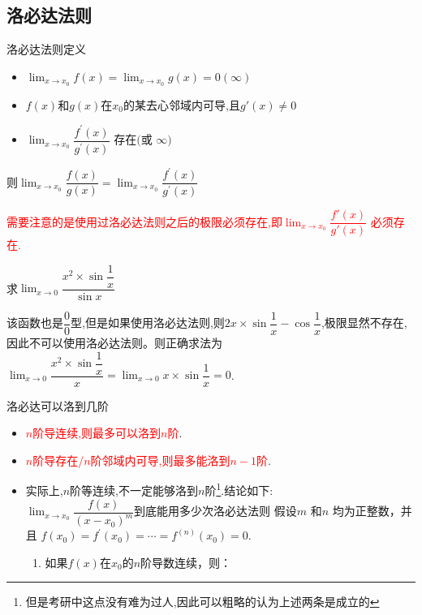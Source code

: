 \documentclass[9pt a4paper, oneside, UTF8]{ctexbook}
\begin{document}
\begin{sloppypar}
    \subsection{洛必达法则}
    \begin{defn}{洛必达法则定义}{}
        \begin{itemize}
            \item $\lim_{x\to x_0}f(x)=\lim_{x\to x_0}g(x)=0(\infty)$
            \item $f(x)$和$g(x)$在$x_0$的某去心邻域内可导,且$g'(x) \neq 0$
            \item $\lim_{x\to x_0}\dfrac{f^{\prime}(x)}{g^{\prime}(x)}\text{ 存在(或 }\infty)$
        \end{itemize}
        则$\lim_{x\to x_{0}}\dfrac{f(x)}{g(x)}=\lim_{x\to x_{0}}\dfrac{f^{'}(x)}{g^{'}(x)}$
    \end{defn}
    \textcolor{red}{需要注意的是使用过洛必达法则之后的极限必须存在,即$\lim _{x \to x_0}\dfrac{f'(x)}{g'(x)}$ 必须存在.}
    \begin{problem}
    求$\lim _{x \to 0}\dfrac{x^2 \times \sin \dfrac{1}{x}}{\sin x}$
    \end{problem}
    \begin{solution}
        该函数也是$\dfrac{0}{0}$型,但是如果使用洛必达法则,则$2x \times \sin \dfrac{1}{x}-\cos \dfrac{1}{x}$,极限显然不存在,因此不可以使用洛必达法则。则正确求法为$\lim _{x\to 0}\dfrac{x^2\times \sin \dfrac{1}{x}}{x}=\lim_{x\to 0}x\times\sin\dfrac{1}{x}=0$.
    \end{solution}
    \begin{criterion}{洛必达可以洛到几阶}{}
        \begin{itemize}
            \item \textcolor{red}{$n$阶导连续,则最多可以洛到$n$阶}.
            \item \textcolor{red}{$n$阶导存在/$n$阶邻域内可导,则最多能洛到$n-1$阶}.
            \item 实际上,$n$阶等连续,不一定能够洛到$n$阶\footnote{但是考研中这点没有难为过人,因此可以粗略的认为上述两条是成立的}.结论如下:\\
            $\lim_{x\to x_0}\dfrac{f(x)}{\left(x-x_0\right)^m}$到底能用多少次洛必达法则
            假设$m$ 和$n$ 均为正整数，并且 $f(x_0)=f^{\prime}(x_0)=\cdots=f^{(n)}(x_0)=0.$ 
            \begin{enumerate}
                \item 如果$f(x)$在$x_0$的$n$阶导数连续，则：
                    \begin{enumerate}

\end{enumerate}
\end{enumerate}
\end{itemize}
\end{criterion}
\end{sloppypar}
\end{document}

